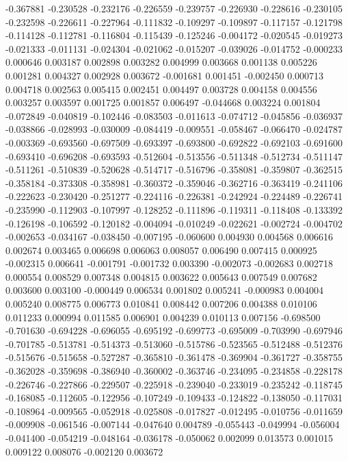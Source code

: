 -0.367881
-0.230528
-0.232176
-0.226559
-0.239757
-0.226930
-0.228616
-0.230105
-0.232598
-0.226611
-0.227964
-0.111832
-0.109297
-0.109897
-0.117157
-0.121798
-0.114128
-0.112781
-0.116804
-0.115439
-0.125246
-0.004172
-0.020545
-0.019273
-0.021333
-0.011131
-0.024304
-0.021062
-0.015207
-0.039026
-0.014752
-0.000233
0.000646
0.003187
0.002898
0.003282
0.004999
0.003668
0.001138
0.005226
0.001281
0.004327
0.002928
0.003672
-0.001681
0.001451
-0.002450
0.000713
0.004718
0.002563
0.005415
0.002451
0.004497
0.003728
0.004158
0.004556
0.003257
0.003597
0.001725
0.001857
0.006497
-0.044668
0.003224
0.001804
-0.072849
-0.040819
-0.102446
-0.083503
-0.011613
-0.074712
-0.045856
-0.036937
-0.038866
-0.028993
-0.030009
-0.084419
-0.009551
-0.058467
-0.066470
-0.024787
-0.003369
-0.693560
-0.697509
-0.693397
-0.693800
-0.692822
-0.692103
-0.691600
-0.693410
-0.696208
-0.693593
-0.512604
-0.513556
-0.511348
-0.512734
-0.511147
-0.511261
-0.510839
-0.520628
-0.514717
-0.516796
-0.358081
-0.359807
-0.362515
-0.358184
-0.373308
-0.358981
-0.360372
-0.359046
-0.362716
-0.363419
-0.241106
-0.222623
-0.230420
-0.251277
-0.224116
-0.226381
-0.242924
-0.224489
-0.226741
-0.235990
-0.112903
-0.107997
-0.128252
-0.111896
-0.119311
-0.118408
-0.133392
-0.126198
-0.106592
-0.120182
-0.004094
-0.010249
-0.022621
-0.002724
-0.004702
-0.002653
-0.034167
-0.038450
-0.007195
-0.060600
0.004930
0.004568
0.006616
0.002674
0.003465
0.006698
0.006063
0.008057
0.006490
0.007415
0.000925
-0.002315
0.006641
-0.001791
-0.001732
0.003390
-0.002073
-0.002683
0.002718
0.000554
0.008529
0.007348
0.004815
0.003622
0.005643
0.007549
0.007682
0.003600
0.003100
-0.000449
0.006534
0.001802
0.005241
-0.000983
0.004004
0.005240
0.008775
0.006773
0.010841
0.008442
0.007206
0.004388
0.010106
0.011233
0.000994
0.011585
0.006901
0.004239
0.010113
0.007156
-0.698500
-0.701630
-0.694228
-0.696055
-0.695192
-0.699773
-0.695009
-0.703990
-0.697946
-0.701785
-0.513781
-0.514373
-0.513060
-0.515786
-0.523565
-0.512488
-0.512376
-0.515676
-0.515658
-0.527287
-0.365810
-0.361478
-0.369904
-0.361727
-0.358755
-0.362028
-0.359698
-0.386940
-0.360002
-0.363746
-0.234095
-0.234858
-0.228178
-0.226746
-0.227866
-0.229507
-0.225918
-0.239040
-0.233019
-0.235242
-0.118745
-0.168085
-0.112605
-0.122956
-0.107249
-0.109433
-0.124822
-0.138050
-0.117031
-0.108964
-0.009565
-0.052918
-0.025808
-0.017827
-0.012495
-0.010756
-0.011659
-0.009908
-0.061546
-0.007144
-0.047640
0.004789
-0.055443
-0.049994
-0.056004
-0.041400
-0.054219
-0.048164
-0.036178
-0.050062
0.002099
0.013573
0.001015
0.009122
0.008076
-0.002120
0.003672
